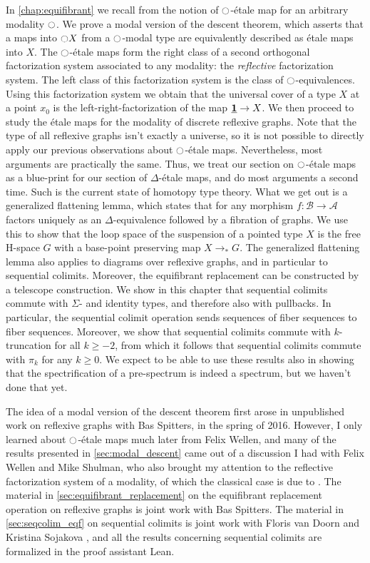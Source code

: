 In \cref{chap:equifibrant} we recall from \cite{WellenPhD} the notion of ${\ocircle}$-\'etale map for an arbitrary modality ${\ocircle}$. We prove a modal version of the descent theorem, which asserts that a maps into ${\ocircle} X$ from a ${\ocircle}$-modal type are equivalently described as \'etale maps into $X$. The ${\ocircle}$-\'etale maps form the right class of a second orthogonal factorization system associated to any modality: the \emph{reflective} factorization system. The left class of this factorization system is the class of ${\ocircle}$-equivalences. Using this factorization system we obtain that the universal cover of a type $X$ at a point $x_0$ is the left-right-factorization of the map $\underline{\mathbf{1}}\to X$. 
We then proceed to study the \'etale maps for the modality of discrete reflexive graphs. Note that the type of all reflexive graphs isn't exactly a universe, so it is not possible to directly apply our previous observations about ${\ocircle}$-\'etale maps. Nevertheless, most arguments are practically the same. Thus, we treat our section on ${\ocircle}$-\'etale maps as a blue-print for our section of $\Delta$-\'etale maps, and do most arguments a second time. Such is the current state of homotopy type theory. What we get out is a generalized flattening lemma, which states that for any morphism $f:\mathcal{B}\to\mathcal{A}$ factors uniquely as an $\Delta$-equivalence followed by a fibration of graphs. We use this to show that the loop space of the suspension of a pointed type $X$ is the free H-space $G$ with a base-point preserving map $X\to_\ast G$. The generalized flattening lemma also applies to diagrams over reflexive graphs, and in particular to sequential colimits. Moreover, the equifibrant replacement can be constructed by a telescope construction. We show in this chapter that sequential colimits commute with $\Sigma$- and identity types, and therefore also with pullbacks. In particular, the sequential colimit operation sends sequences of fiber sequences to fiber sequences. Moreover, we show that sequential colimits commute with $k$-truncation for all $k\geq -2$, from which it follows that sequential colimits commute with $\pi_k$ for any $k\geq 0$. We expect to be able to use these results also in showing that the spectrification of a pre-spectrum is indeed a spectrum, but we haven't done that yet.

The idea of a modal version of the descent theorem first arose in unpublished work on reflexive graphs with Bas Spitters, in the spring of 2016. However, I only learned about ${\ocircle}$-\'etale maps much later from Felix Wellen, and many of the results presented in \cref{sec:modal_descent} came out of a discussion I had with Felix Wellen and Mike Shulman, who also brought my attention to the reflective factorization system of a modality, of which the classical case is due to \cite{chk:reflocfact}. 
The material in \cref{sec:equifibrant_replacement} on the equifibrant replacement operation on reflexive graphs is joint work with Bas Spitters. 
The material in \cref{sec:seqcolim_eqf} on sequential colimits is joint work with Floris van Doorn and Kristina Sojakova \cite{DoornRijkeSojakova}, and all the results concerning sequential colimits are formalized in the proof assistant Lean. 

